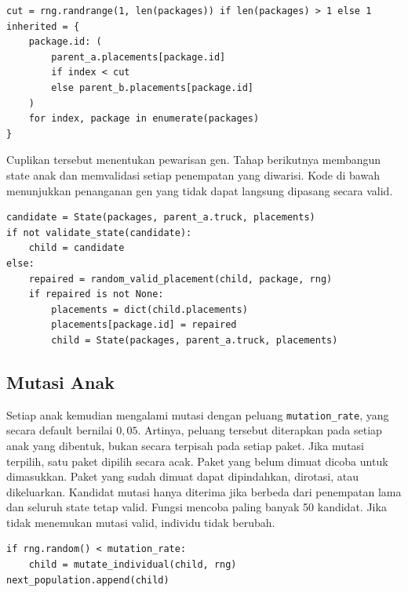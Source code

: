 \begin{lstlisting}[caption={Mengambil gen dari dua induk pada satu titik potong},label={lst:ga-crossover-gene}]
cut = rng.randrange(1, len(packages)) if len(packages) > 1 else 1
inherited = {
    package.id: (
        parent_a.placements[package.id]
        if index < cut
        else parent_b.placements[package.id]
    )
    for index, package in enumerate(packages)
}
\end{lstlisting}

Cuplikan tersebut menentukan pewarisan gen. Tahap berikutnya membangun state anak dan memvalidasi setiap penempatan yang diwarisi. Kode di bawah menunjukkan penanganan gen yang tidak dapat langsung dipasang secara valid.

\begin{lstlisting}[caption={Mempertahankan validitas anak hasil crossover},label={lst:ga-crossover-repair}]
candidate = State(packages, parent_a.truck, placements)
if not validate_state(candidate):
    child = candidate
else:
    repaired = random_valid_placement(child, package, rng)
    if repaired is not None:
        placements = dict(child.placements)
        placements[package.id] = repaired
        child = State(packages, parent_a.truck, placements)
\end{lstlisting}

\subsection{Mutasi Anak}

Setiap anak kemudian mengalami mutasi dengan peluang \texttt{mutation\_rate}, yang secara default bernilai $0{,}05$. Artinya, peluang tersebut diterapkan pada setiap anak yang dibentuk, bukan secara terpisah pada setiap paket. Jika mutasi terpilih, satu paket dipilih secara acak. Paket yang belum dimuat dicoba untuk dimasukkan. Paket yang sudah dimuat dapat dipindahkan, dirotasi, atau dikeluarkan. Kandidat mutasi hanya diterima jika berbeda dari penempatan lama dan seluruh state tetap valid. Fungsi mencoba paling banyak 50 kandidat. Jika tidak menemukan mutasi valid, individu tidak berubah.

\begin{lstlisting}[caption={Peluang mutasi pada setiap anak},label={lst:ga-mutation-rate}]
if rng.random() < mutation_rate:
    child = mutate_individual(child, rng)
next_population.append(child)
\end{lstlisting}

